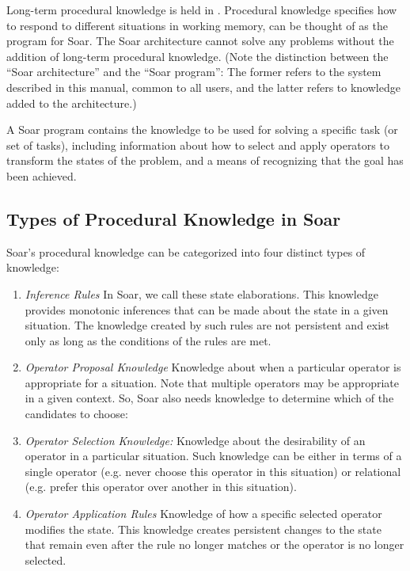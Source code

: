 Long-term procedural knowledge is held in .
Procedural knowledge specifies how to respond to different
situations in working memory, can be thought of as the program for Soar.
The Soar architecture cannot solve any problems without the addition of
long-term procedural knowledge.  (Note the distinction between the ``Soar
architecture'' and the ``Soar program'': The former refers to the system
described in this manual, common to all users, and the latter refers to
knowledge added to the architecture.)

A Soar program contains the knowledge to be used for solving a specific
task (or set of tasks), including information about how to select and
apply operators to transform the states of the problem, and a means of
recognizing that the goal has been achieved.  

\subsection{Types of Procedural Knowledge in Soar}
\label{LIST:4KnowledgeTypes}

Soar's procedural knowledge can be categorized into  four distinct types of
knowledge:\vspace{-10pt} 
\begin{enumerate}
  \item \textit{Inference Rules} \newline 
In Soar, we call these state elaborations.  This knowledge provides monotonic inferences
that can be made about the state in a given situation. The knowledge created by such rules
are not persistent and exist only as long as the conditions of the rules are met.
  \item \textit{Operator Proposal Knowledge} \newline
Knowledge about when a particular operator is appropriate for a situation.
Note that multiple operators may be appropriate in a given context.
So, Soar also needs knowledge to determine which of the candidates to choose:  
  \item	\textit{Operator Selection Knowledge:} \newline
Knowledge about the desirability of an operator in a particular situation.
Such knowledge can be either in terms of a single operator (e.g. never choose this 
operator in this situation) or relational (e.g. prefer this operator over another
in this situation).
  \item \textit{Operator Application Rules} \newline
Knowledge of how a specific selected operator modifies the state.
This knowledge creates persistent changes to the state that remain even 
after the rule no longer matches or the operator is no longer selected.
\end{enumerate}

